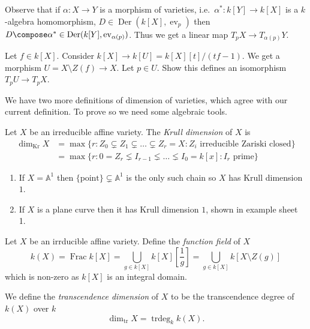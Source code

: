 \documentclass[a4paper]{article}
\renewcommand{\A}{\mathbb{A}}
\DeclareMathOperator{\ev}{ev}
\DeclareMathOperator{\Der}{Der} %
\begin{document}
Observe that if \(\alpha: X \to Y\) is a morphism of varieties, i.e.\ \(\alpha^*: k[Y] \to k[X]\) is a \(k\)-algebra homomorphism, \(D \in \Der(k[X], \ev_p)\) then \(D \compose \alpha^* \in \Der(k[Y], \ev_{\alpha(p)})\). Thus we get a linear map \(T_pX \to T_{\alpha(p)}Y\).

\begin{ex}
  Let \(f \in k[X]\). Consider \(k[X] \to k[U] = k[X][t]/(tf - 1)\). We get a morphism \(U = X \setminus Z(f) \to X\). Let \(p \in U\). Show this defines an isomorphism \(T_pU \to T_pX\).
\end{ex}

We have two more definitions of dimension of varieties, which agree with our current definition. To prove so we need some algebraic tools.

\begin{definition}
  Let \(X\) be an irreducible affine variety. The \emph{Krull dimension} of \(X\) is
  \begin{align*}
    \dim_{\text{Kr}} X
    &= \max \{r: Z_0 \subsetneq Z_1 \subsetneq \dots \subsetneq Z_r = X: Z_i \text{ irreducible Zariski closed}\} \\
    &= \max \{r: 0 = Z_r \lneq I_{r - 1} \lneq \dots \lneq I_0 = k[x]: I_r \text{ prime}\}
  \end{align*}
\end{definition}

\begin{eg}\leavevmode
  \begin{enumerate}
  \item If \(X = \A^1\) then \(\{\text{point}\} \subsetneq \A^1\) is the only such chain so \(X\) has Krull dimension \(1\).
  \item If \(X\) is a plane curve then it has Krull dimension \(1\), shown in example sheet 1.
  \end{enumerate}
\end{eg}

\begin{definition}
  Let \(X\) be an irrducible affine variety. Define the \emph{function field} of \(X\)
  \[
    k(X)
    = \operatorname{Frac} k[X]
    = \bigcup_{g \in k[X]} k[X][\frac{1}{g}]
    = \bigcup_{g \in k[X]} k[X \setminus Z(g)]
  \]
  which is non-zero as \(k[X]\) is an integral domain.

  We define the \emph{transcendence dimension} of \(X\) to be the transcendence degree of \(k(X)\) over \(k\)
  \[
    \dim_{\text{tr}} X = \operatorname{trdeg}_k k(X).
  \]
\end{definition}
\end{document}
